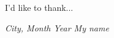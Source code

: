 
\begin{acknowledgements}      %
I'd like to thank...

\vspace{1cm}
\emph{City, Month Year \hfill My name}
\end{acknowledgements}
